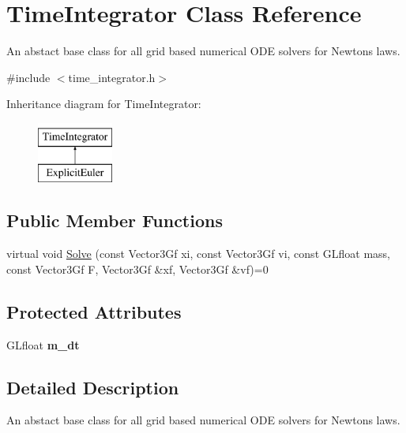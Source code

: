 \hypertarget{classTimeIntegrator}{}\section{Time\+Integrator Class Reference}
\label{classTimeIntegrator}


An abstact base class for all grid based numerical O\+DE solvers for Newton\textquotesingle{}s laws.  




{\ttfamily \#include $<$time\+\_\+integrator.\+h$>$}

Inheritance diagram for Time\+Integrator\+:\begin{figure}[H]
\begin{center}
\leavevmode
\includegraphics[height=2.000000cm]{classTimeIntegrator}
\end{center}
\end{figure}
\subsection*{Public Member Functions}
\begin{DoxyCompactItemize}
\item 
virtual void \hyperlink{classTimeIntegrator_ad69eadc41d788f355959428ff9f84608}{Solve} (const Vector3\+Gf xi, const Vector3\+Gf vi, const G\+Lfloat mass, const Vector3\+Gf F, Vector3\+Gf \&xf, Vector3\+Gf \&vf)=0
\end{DoxyCompactItemize}
\subsection*{Protected Attributes}
\begin{DoxyCompactItemize}
\item 
\mbox{\label{classTimeIntegrator_a8912a1a1f00d49556509a91dd999991f}} 
G\+Lfloat {\bfseries m\+\_\+dt}
\end{DoxyCompactItemize}


\subsection{Detailed Description}
An abstact base class for all grid based numerical O\+DE solvers for Newton\textquotesingle{}s laws. 

